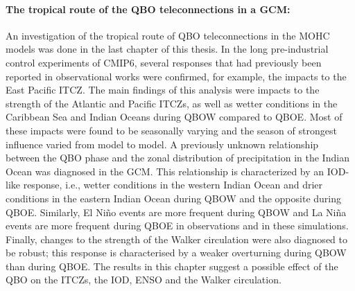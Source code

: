 \paragraph{The tropical route of the QBO teleconnections in a GCM:}
An investigation of the tropical route of QBO teleconnections in the MOHC models was done in the last chapter of this thesis. 
In the long pre-industrial control experiments of CMIP6, several responses that had previously been reported in observational works were confirmed, for example, the impacts to the East Pacific ITCZ. 
The main findings of this analysis were impacts to the strength of the Atlantic and Pacific ITCZs, as well as wetter conditions in the Caribbean Sea and Indian Oceans during QBOW compared to QBOE. 
Most of these impacts were found to be seasonally varying and the season of strongest influence varied from model to model. 
A previously unknown relationship between the QBO phase and the zonal distribution of precipitation in the Indian Ocean was diagnosed in the GCM. This relationship is characterized by an IOD-like response, i.e., wetter conditions in the western Indian Ocean and drier conditions in the eastern Indian Ocean during QBOW and the opposite during QBOE. 
Similarly, El Niño events are more frequent during QBOW and La Niña events are more frequent during QBOE in observations and in these simulations.
Finally, changes to the strength of the Walker circulation were also diagnosed to be robust; this response is characterised by a weaker overturning during QBOW than during QBOE. 
The results in this chapter suggest a possible effect of the QBO on the ITCZs, the IOD, ENSO and the Walker circulation. 


